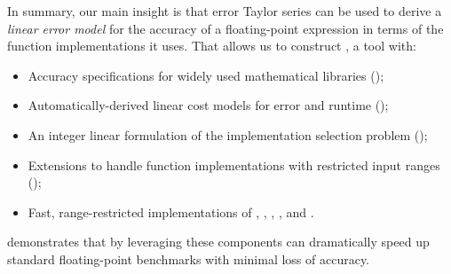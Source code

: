 \documentclass[paper.tex]{subfiles}
\begin{document}
\medskip
\noindent
In summary, our main insight
  is that error Taylor series can be used
  to derive a \textit{linear error model}
  for the accuracy of a floating-point expression
  in terms of the function implementations it uses.
That allows us to construct \name, a tool with:
\begin{itemize}
\item Accuracy specifications for widely used mathematical libraries ();
\item Automatically-derived linear cost models for error and runtime ();
\item An integer linear formulation of the implementation selection problem ();
\item Extensions to handle function implementations with restricted input ranges ();
\item Fast, range-restricted implementations of , , , , and .
\end{itemize}
 demonstrates
  that by leveraging these components
  \name can dramatically speed up standard floating-point benchmarks
  with minimal loss of accuracy.
\end{document}
